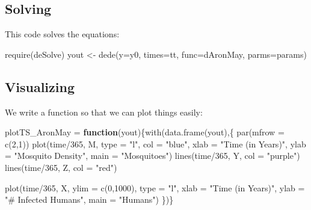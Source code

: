 \documentclass[
]{book}
\newenvironment{Shaded}{\begin{snugshade}}{\end{snugshade}}
\newcommand{\AttributeTok}[1]{\textcolor[rgb]{0.77,0.63,0.00}{#1}}
\newcommand{\ControlFlowTok}[1]{\textcolor[rgb]{0.13,0.29,0.53}{\textbf{#1}}}
\newcommand{\DecValTok}[1]{\textcolor[rgb]{0.00,0.00,0.81}{#1}}
\newcommand{\FunctionTok}[1]{\textcolor[rgb]{0.00,0.00,0.00}{#1}}
\newcommand{\NormalTok}[1]{#1}
\newcommand{\OtherTok}[1]{\textcolor[rgb]{0.56,0.35,0.01}{#1}}
\newcommand{\SpecialCharTok}[1]{\textcolor[rgb]{0.00,0.00,0.00}{#1}}
\newcommand{\StringTok}[1]{\textcolor[rgb]{0.31,0.60,0.02}{#1}}
\begin{document}
\hypertarget{solving}{%
\subsection{Solving}\label{solving}}

This code solves the equations:

\begin{Shaded}
\begin{Highlighting}[]
\FunctionTok{require}\NormalTok{(deSolve)}
\NormalTok{yout }\OtherTok{\textless{}{-}} \FunctionTok{dede}\NormalTok{(}\AttributeTok{y=}\NormalTok{y0, }\AttributeTok{times=}\NormalTok{tt, }\AttributeTok{func=}\NormalTok{dAronMay, }\AttributeTok{parms=}\NormalTok{params) }
\end{Highlighting}
\end{Shaded}

\hypertarget{visualizing}{%
\subsection{Visualizing}\label{visualizing}}

We write a function so that we can plot things easily:

\begin{Shaded}
\begin{Highlighting}[]
\NormalTok{plotTS\_AronMay }\OtherTok{=} \ControlFlowTok{function}\NormalTok{(yout)\{}\FunctionTok{with}\NormalTok{(}\FunctionTok{data.frame}\NormalTok{(yout),\{}
  \FunctionTok{par}\NormalTok{(}\AttributeTok{mfrow =} \FunctionTok{c}\NormalTok{(}\DecValTok{2}\NormalTok{,}\DecValTok{1}\NormalTok{))}
  \FunctionTok{plot}\NormalTok{(time}\SpecialCharTok{/}\DecValTok{365}\NormalTok{, M, }\AttributeTok{type =} \StringTok{"l"}\NormalTok{, }\AttributeTok{col =} \StringTok{"blue"}\NormalTok{, }
       \AttributeTok{xlab =} \StringTok{"Time (in Years)"}\NormalTok{, }
       \AttributeTok{ylab =} \StringTok{"Mosquito Density"}\NormalTok{, }
       \AttributeTok{main =} \StringTok{"Mosquitoes"}\NormalTok{)}
  \FunctionTok{lines}\NormalTok{(time}\SpecialCharTok{/}\DecValTok{365}\NormalTok{, Y, }\AttributeTok{col =} \StringTok{"purple"}\NormalTok{)}
  \FunctionTok{lines}\NormalTok{(time}\SpecialCharTok{/}\DecValTok{365}\NormalTok{, Z, }\AttributeTok{col =} \StringTok{"red"}\NormalTok{)}
  
  \FunctionTok{plot}\NormalTok{(time}\SpecialCharTok{/}\DecValTok{365}\NormalTok{, X, }\AttributeTok{ylim =} \FunctionTok{c}\NormalTok{(}\DecValTok{0}\NormalTok{,}\DecValTok{1000}\NormalTok{), }\AttributeTok{type =} \StringTok{"l"}\NormalTok{, }
       \AttributeTok{xlab =} \StringTok{"Time (in Years)"}\NormalTok{, }
       \AttributeTok{ylab =} \StringTok{"\# Infected Humans"}\NormalTok{, }
       \AttributeTok{main =} \StringTok{"Humans"}\NormalTok{)}
\NormalTok{\})\}}
\end{Highlighting}
\end{Shaded}
\end{document}

